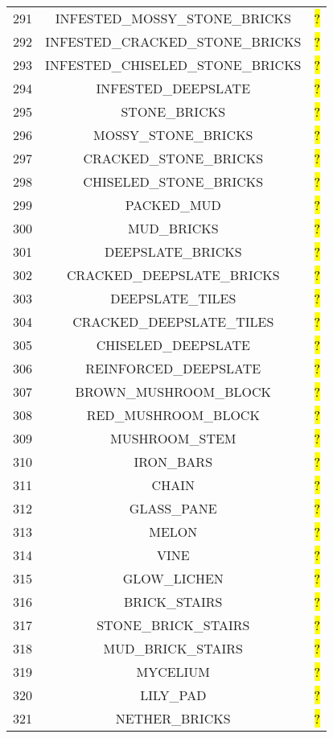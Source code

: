\documentclass[11pt]{article}
\newcommand\myworries[1]{\sethlcolor{red}\hl{#1}}
\begin{document}
\begin{longtable}{ |c|c|c| }
	291 & INFESTED\_MOSSY\_STONE\_BRICKS & \myworries{?} \\
	292 & INFESTED\_CRACKED\_STONE\_BRICKS & \myworries{?} \\
	293 & INFESTED\_CHISELED\_STONE\_BRICKS & \myworries{?} \\
	294 & INFESTED\_DEEPSLATE & \myworries{?} \\
	295 & STONE\_BRICKS & \myworries{?} \\
	296 & MOSSY\_STONE\_BRICKS & \myworries{?} \\
	297 & CRACKED\_STONE\_BRICKS & \myworries{?} \\
	298 & CHISELED\_STONE\_BRICKS & \myworries{?} \\
	299 & PACKED\_MUD & \myworries{?} \\
	300 & MUD\_BRICKS & \myworries{?} \\
	301 & DEEPSLATE\_BRICKS & \myworries{?} \\
	302 & CRACKED\_DEEPSLATE\_BRICKS & \myworries{?} \\
	303 & DEEPSLATE\_TILES & \myworries{?} \\
	304 & CRACKED\_DEEPSLATE\_TILES & \myworries{?} \\
	305 & CHISELED\_DEEPSLATE & \myworries{?} \\
	306 & REINFORCED\_DEEPSLATE & \myworries{?} \\
	307 & BROWN\_MUSHROOM\_BLOCK & \myworries{?} \\
	308 & RED\_MUSHROOM\_BLOCK & \myworries{?} \\
	309 & MUSHROOM\_STEM & \myworries{?} \\
	310 & IRON\_BARS & \myworries{?} \\
	311 & CHAIN & \myworries{?} \\
	312 & GLASS\_PANE & \myworries{?} \\
	313 & MELON & \myworries{?} \\
	314 & VINE & \myworries{?} \\
	315 & GLOW\_LICHEN & \myworries{?} \\
	316 & BRICK\_STAIRS & \myworries{?} \\
	317 & STONE\_BRICK\_STAIRS & \myworries{?} \\
	318 & MUD\_BRICK\_STAIRS & \myworries{?} \\
	319 & MYCELIUM & \myworries{?} \\
	320 & LILY\_PAD & \myworries{?} \\
	321 & NETHER\_BRICKS & \myworries{?} \\

\end{longtable}
\end{document}
